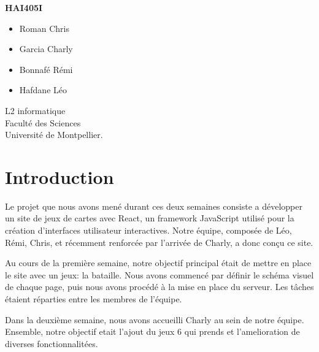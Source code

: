 \documentclass[a4paper]{article}
\begin{document}
\centerline{\Huge\bf HAI405I}
\vspace*{1.5cm}
\begin{center}               %
	

\end{center}
\vspace*{1.5cm}


\vspace*{1.5cm}


\begin{itemize}
\item Roman Chris
\item Garcia Charly
\item Bonnafé Rémi
\item Hafdane Léo
\end{itemize}
\vspace*{1.5cm}
\begin{center}
  L2 informatique\\
  Faculté des Sciences\\
Université de Montpellier.
\end{center}

\newpage

\section{Introduction}
Le projet que nous avons mené durant ces deux semaines consiste a développer un site de jeux de cartes avec React, un framework JavaScript utilisé pour la création d'interfaces utilisateur interactives. Notre équipe, composée de Léo, Rémi, Chris, et récemment renforcée par l'arrivée de Charly, a donc conçu ce site.

Au cours de la première semaine, notre objectif principal était de mettre en place le site avec un jeux: la bataille. Nous avons commencé par définir le schéma visuel de chaque page, puis nous avons procédé à la mise en place du serveur. Les tâches étaient réparties entre les membres de l'équipe.

Dans la deuxième semaine, nous avons accueilli Charly au sein de notre équipe. Ensemble,  notre objectif etait l'ajout du jeux 6 qui prends et l'amelioration de diverses fonctionnalitées.
\end{document}
